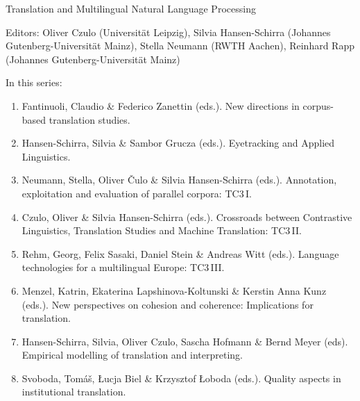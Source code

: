 {\large Translation and Multilingual Natural Language Processing}

\bigskip

Editors: Oliver Czulo (Universität Leipzig),
Silvia Hansen-Schirra (Johannes Gutenberg-Universität Mainz), 
Stella Neumann (RWTH Aachen),
Reinhard Rapp (Johannes Gutenberg-Universität Mainz)

\bigskip

In this series:

\begin{enumerate}
\item Fantinuoli, Claudio \& Federico Zanettin (eds.). New directions in corpus-based translation studies.
\item Hansen-Schirra, Silvia \& Sambor Grucza (eds.). Eyetracking and Applied Linguistics.
\item Neumann, Stella, Oliver Čulo \& Silvia Hansen-Schirra (eds.). Annotation, exploitation and evaluation of parallel corpora: TC3\,I.
\item Czulo, Oliver  \& Silvia Hansen-Schirra (eds.). Crossroads between Contrastive Linguistics, Translation Studies and Machine Translation: TC3\,II.
\item Rehm, Georg, Felix Sasaki, Daniel Stein \& Andreas Witt (eds.). Language technologies for a multilingual Europe: TC3\,III.
\item Menzel, Katrin, Ekaterina Lapshinova-Koltunski \& Kerstin Anna Kunz  (eds.). New perspectives on cohesion and coherence: Implications for translation.
\item Hansen-Schirra, Silvia, Oliver Czulo, Sascha Hofmann \& Bernd Meyer (eds). Empirical modelling of translation and interpreting.
\item Svoboda, Tomáš, Łucja Biel \& Krzysztof Łoboda (eds.). Quality aspects in institutional translation.
\end{enumerate}

 
